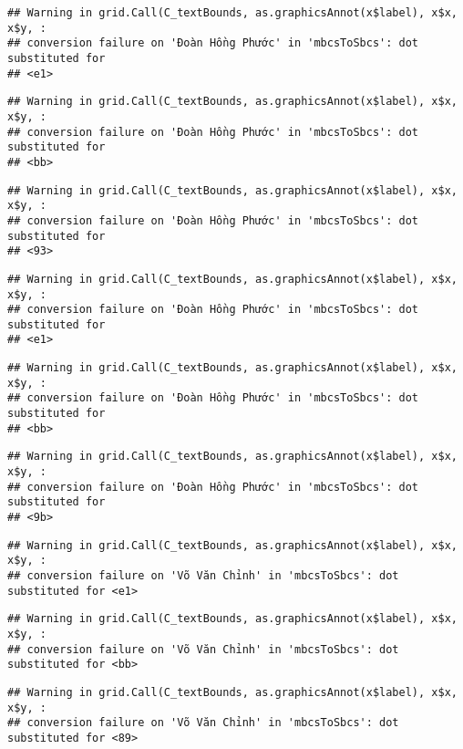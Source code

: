 \documentclass[
]{article}
\begin{document}
\begin{verbatim}
## Warning in grid.Call(C_textBounds, as.graphicsAnnot(x$label), x$x, x$y, :
## conversion failure on 'Đoàn Hồng Phước' in 'mbcsToSbcs': dot substituted for
## <e1>
\end{verbatim}

\begin{verbatim}
## Warning in grid.Call(C_textBounds, as.graphicsAnnot(x$label), x$x, x$y, :
## conversion failure on 'Đoàn Hồng Phước' in 'mbcsToSbcs': dot substituted for
## <bb>
\end{verbatim}

\begin{verbatim}
## Warning in grid.Call(C_textBounds, as.graphicsAnnot(x$label), x$x, x$y, :
## conversion failure on 'Đoàn Hồng Phước' in 'mbcsToSbcs': dot substituted for
## <93>
\end{verbatim}

\begin{verbatim}
## Warning in grid.Call(C_textBounds, as.graphicsAnnot(x$label), x$x, x$y, :
## conversion failure on 'Đoàn Hồng Phước' in 'mbcsToSbcs': dot substituted for
## <e1>
\end{verbatim}

\begin{verbatim}
## Warning in grid.Call(C_textBounds, as.graphicsAnnot(x$label), x$x, x$y, :
## conversion failure on 'Đoàn Hồng Phước' in 'mbcsToSbcs': dot substituted for
## <bb>
\end{verbatim}

\begin{verbatim}
## Warning in grid.Call(C_textBounds, as.graphicsAnnot(x$label), x$x, x$y, :
## conversion failure on 'Đoàn Hồng Phước' in 'mbcsToSbcs': dot substituted for
## <9b>
\end{verbatim}

\begin{verbatim}
## Warning in grid.Call(C_textBounds, as.graphicsAnnot(x$label), x$x, x$y, :
## conversion failure on 'Võ Văn Chỉnh' in 'mbcsToSbcs': dot substituted for <e1>
\end{verbatim}

\begin{verbatim}
## Warning in grid.Call(C_textBounds, as.graphicsAnnot(x$label), x$x, x$y, :
## conversion failure on 'Võ Văn Chỉnh' in 'mbcsToSbcs': dot substituted for <bb>
\end{verbatim}

\begin{verbatim}
## Warning in grid.Call(C_textBounds, as.graphicsAnnot(x$label), x$x, x$y, :
## conversion failure on 'Võ Văn Chỉnh' in 'mbcsToSbcs': dot substituted for <89>
\end{verbatim}
\end{document}
